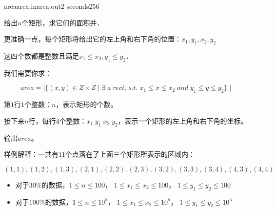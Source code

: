 \documentclass[11pt,a4paper,oneside]{article}
\begin{document}
	\begin{problem}{area}{area.in}{area.out}{2 seconds}{256}
		
	给出$n$个矩形，求它们的面积并．
	
	更准确一点，每个矩形将给出它的左上角和右下角的位置：$x_1, y_1, x_2, y_2$
	
	这四个数都是整数且满足$x_1 \leq x_2, y_1 \leq y_2$．
	
	我们需要你求：
	
	$$area = \mid \{ (x,y) \in Z\times Z \mid \exists \; a \; rect. \; s.t. \; x_1 \leq x \leq x_2 \; and \; y_1 \leq y \leq y_2  \} \mid $$
		
	\InputFile
	
	第$1$行$1$个整数：$n$，表示矩形的个数。
	
	接下来$n$行，每行$4$个整数：$ x_1\; y_1 \; x_2 \; y_2 $，表示一个矩形的左上角和右下角的坐标。
	
	\OutputFile
	
	输出$area$。
	
	\Example
		
	\begin{example}
	\end{example}
	
	样例解释：一共有$11$个点落在了上面三个矩形所表示的区域内：
	
	$(1,1), (1,2), (1,3), (2,1), (2,2), (2,3), (3,2), (3,3), (3,4), (4,3), (4,4)$
	
	\Note
	\begin{itemize}
		\item 对于$30\%$的数据，$1 \leq n \leq 100$， $1 \leq x_1 \leq x_2 \leq 100$， $1 \leq y_1 \leq y_2 \leq 100$
		\item 对于$100\%$的数据，$1 \leq n \leq 10^5$， $1 \leq x_1 \leq x_2 \leq 10^5$， $ 1 \leq y_1 \leq y_2 \leq 10^5$
	\end{itemize}
	
\end{problem}
\end{document}
